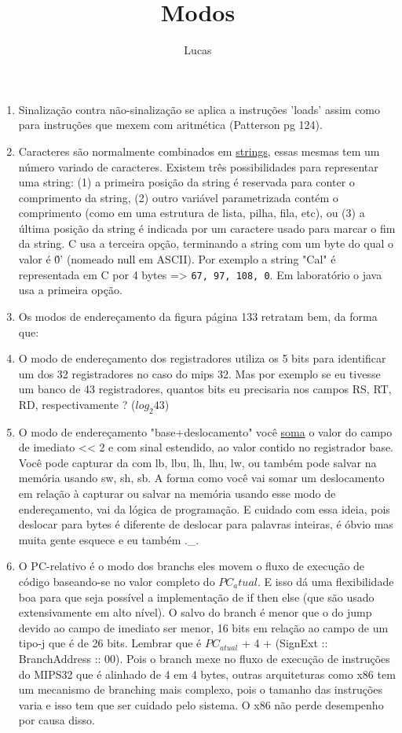 \documentclass{article}
\author{Lucas}
\title{Modos}
\begin{document}
\maketitle

\begin{enumerate}

\item Sinalização contra não-sinalização se aplica a instruções 'loads' assim 
como para instruções que mexem com aritmética (Patterson pg 124).

\item Caracteres são normalmente combinados em \underline{strings}, essas 
mesmas tem um número variado de caracteres. Existem três possibilidades para 
representar uma string: (1) a primeira posição da string é reservada para 
conter o comprimento da string, (2) outro variável parametrizada contém o 
comprimento (como em uma estrutura de lista, pilha, fila, etc), ou (3) a última 
posição da string é indicada por um caractere usado para marcar o fim da 
string. C usa a terceira opção, terminando a string com um byte do qual o valor 
é \'0' (nomeado null em ASCII). Por exemplo a string "Cal" é representada em C 
por 4 bytes => \verb|67, 97, 108, 0|. Em laboratório o java usa a primeira 
opção.

\item Os modos de endereçamento da figura página 133 retratam bem, da forma que:

\item O modo de endereçamento dos registradores utiliza os 5 bits para 
identificar um dos 32 registradores no caso do mips 32. Mas por exemplo se eu 
tivesse um banco de 43 registradores, quantos bits eu precisaria nos campos RS, 
RT, RD, respectivamente ? ($log_2 43$)

\item O modo de endereçamento "base+deslocamento" você \underline{soma} o 
valor do campo de imediato << 2 e com sinal estendido, ao valor contido no 
registrador base. Você pode capturar da com lb, lbu, lh, lhu, lw, ou também 
pode salvar na memória usando sw, sh, sb. A forma como você vai somar um 
deslocamento em relação à capturar ou salvar na memória usando esse modo de 
endereçamento, vai da lógica de programação. E cuidado com essa ideia, pois 
deslocar para bytes é diferente de deslocar para palavras inteiras, é óbvio mas 
muita gente esquece e eu também .\_.

\item O PC-relativo é o modo dos branchs eles movem o fluxo de execução de
código baseando-se no valor completo do $PC_atual$. E isso dá uma flexibilidade
boa para que seja possível a implementação de if then else (que são usado
extensivamente em alto nível). O salvo do branch é menor que o do jump devido ao
campo de imediato ser menor, 16 bits em relação ao campo de um tipo-j que é de
26 bits. Lembrar que é $PC_{atual}$ + 4 + (SignExt :: BranchAddress :: 00). Pois
o branch mexe no fluxo de execução de instruções do MIPS32 que é alinhado de 4
em 4 bytes, outras arquiteturas como x86 tem um mecanismo de branching mais
complexo, pois o tamanho das instruções varia e isso tem que ser cuidado pelo
sistema. O x86 não perde desempenho por causa disso.


\end{enumerate}
\end{document}

